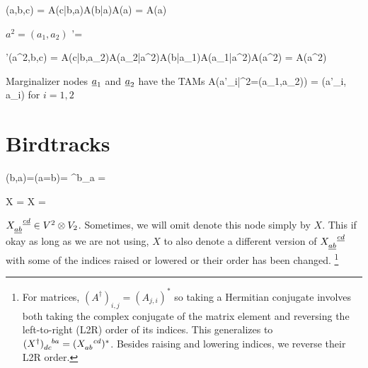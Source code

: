 \beq
\calq(a,b,c)
=
A(c|b,a)A(b|a)A(a)
=
\bcen
{}
\ecen
A(a)
\eeq

$a^2 = (a_1, a_2)$
\beq
\calq'=
\bcen
{}
\ecen
\eeq

\beq
\calq'(a^2,b,c)
=
A(c|b,a_2)A(a_2|a^2)A(b|a_1)A(a_1|a^2)A(a^2)
=
\bcen
{}
\ecen
A(a^2)
\eeq

Marginalizer nodes  $\rva_1$ and $\rva_2$
have the TAMs
\beq \color{blue}
A(a'_i|\rva^2=(a_1,a_2)) = \delta(a'_i, a_i)
\eeq
for $i=1,2$

\section{Birdtracks}



\beq
\delta(b,a)=\indi(a=b)=
\delta^b_a =
\eeq


\beq
{}
X\indices{_\rva_\rvb^\rvc^\rvd}
=
X
=
\bcen
{}\ecen
\eeq

\beq
\bcen
{}\ecen
\rarrow
\bcen
{}\ecen
\eeq
$X\indices{_\rva_\rvb^\rvc^\rvd}\in V^2 \otimes V_2$.
Sometimes, 
we will omit denote
this node simply by $X$.
This if okay as long as
we are not using,
$X$ to also denote
a different version of $X\indices{_\rva_\rvb^\rvc^\rvd}$
with some of the indices
raised or lowered or 
their order has been changed.
\footnote{For matrices,
$(A^\dagger)_{i,j} = (A_{j, i})^*$
so
taking a Hermitian conjugate
involves both taking
the complex conjugate of
the matrix element and reversing the left-to-right (L2R) order of its indices.
This generalizes to 
$(X^\dagger)\indices{_d_c^b^a}=
(X\indices{_a_b^c^d})^*$.
Besides raising and lowering indices, we reverse their L2R order.
}

